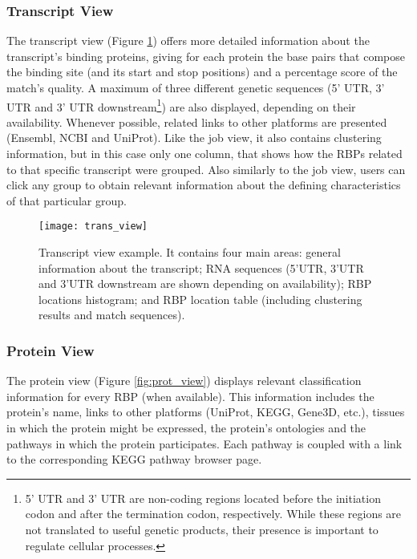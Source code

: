 \subsubsection*{Transcript View}

The transcript view (Figure \ref{fig:trans_view}) offers more detailed
information about the transcript's binding proteins, giving for each protein the
base pairs that compose the binding site (and its start and stop positions) and
a percentage score of the match's quality. A maximum of three different genetic
sequences (5’ UTR, 3’ UTR and 3’ UTR downstream\footnote{5' UTR and 3' UTR are
non-coding regions located before the initiation codon and after the termination
codon, respectively. While these regions are not translated to useful genetic
products, their presence is important to regulate cellular processes.}) are also
displayed, depending on their availability. Whenever possible, related links to
other platforms are presented (Ensembl, NCBI and UniProt). Like the job view, it
also contains clustering information, but in this case only one column, that
shows how the RBPs related to that specific transcript were grouped. Also
similarly to the job view, users can click any group to obtain relevant
information about the defining characteristics of that particular group.

\begin{figure}[!htb]
  \begin{center}
    \leavevmode
    \texttt{[image: trans\_view]}
    \caption[Transcript view example]{
      Transcript view example. It contains four main areas: general information
      about the transcript; RNA sequences (5’UTR, 3’UTR and 3’UTR downstream are
      shown depending on availability); RBP locations histogram; and RBP
      location table (including clustering results and match sequences).
    }
    \label{fig:trans_view}
  \end{center}
\end{figure}

\subsubsection*{Protein View}

The protein view (Figure \ref{fig:prot_view}) displays relevant classification
information for every RBP (when available). This information includes the
protein's name, links to other platforms (UniProt, KEGG, Gene3D, etc.), tissues
in which the protein might be expressed, the protein's ontologies and the pathways
in which the protein participates. Each pathway is coupled with a link to the
corresponding KEGG pathway browser page.

